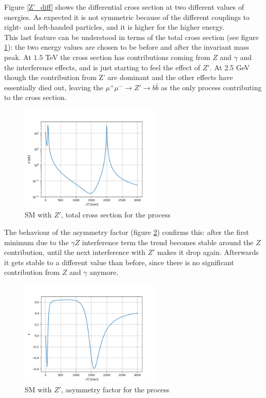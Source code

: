 \documentclass[12pt,letterpaper]{article}
\begin{document}
Figure \ref{Z'_diff} shows the differential cross section at two different values of energies. As expected it is not symmetric because of the different couplings to right- and left-handed particles, and it is higher for the higher energy.\\


This last feature can be understood in terms of the total cross section (see figure \ref{Z'_totalCS}): the two energy values are chosen to be before and after the invariant mass peak. At $1.5$ TeV the cross section has contributions coming from $Z$ and $\gamma$ and the interference effects, and is just starting to feel the effect of $Z'$. At 2.5 GeV though the contribution from Z' are dominant and the other effects have essentially died out, leaving the $\mu^+\mu^-\rightarrow Z'\rightarrow b\bar{b}$ as the only process contributing to the cross section. 

\begin{figure}[!ht]
\centering
\includegraphics[width=0.6\textwidth]{figures/Zprime_TotalCS.png}
\caption{SM with $Z'$, total cross section for the process}
\label{Z'_totalCS}
\end{figure}

The behaviour of the asymmetry factor (figure \ref{Z'_asymm}) confirms this: after the first minimum due to the $\gamma Z$ interference term the trend becomes stable around the $Z$ contribution, until the next interference with $Z'$ makes it drop again. Afterwards it gets stable to a different value than before, since there is no significant contribution from $Z$ and $\gamma$ anymore. \\

\begin{figure}[!ht]
\centering
\includegraphics[width=0.6\textwidth]{figures/Zprime_asymm.png}
\caption{SM with $Z'$, asymmetry factor for the process}
\label{Z'_asymm}
\end{figure}
\end{document}
